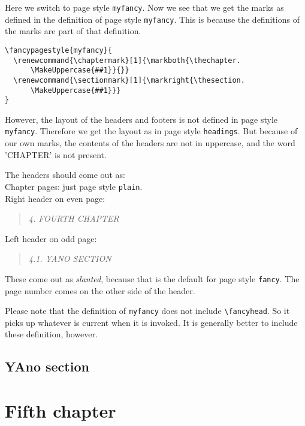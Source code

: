 \documentclass[openany]{book}
\renewcommand{\chaptermark}[1]{\markboth{\thechapter.\ #1}{}}
\renewcommand{\sectionmark}[1]{\markright{\thesection.\ #1}}
\renewcommand{\chaptermark}[1]{\markboth{\thechapter.
      \MakeUppercase{##1}}{}}
\renewcommand{\sectionmark}[1]{\markright{\thesection.
      \MakeUppercase{##1}}}
\renewcommand{\chaptermark}[1]{\markboth{\thechapter.\ ##1}{}}
\renewcommand{\sectionmark}[1]{\markright{\thesection.\ ##1}}
\begin{document}
\noindent
\begin{boxedminipage}{\textwidth}
Here we switch to page style \texttt{myfancy}.
Now we see that we get the marks as defined in the definition of page style \texttt{myfancy}.
This is because the definitions of the marks are  part of that definition.
\begin{verbatim}
\fancypagestyle{myfancy}{
  \renewcommand{\chaptermark}[1]{\markboth{\thechapter.
      \MakeUppercase{##1}}{}}
  \renewcommand{\sectionmark}[1]{\markright{\thesection.
      \MakeUppercase{##1}}}
}
\end{verbatim}

However, the layout of the headers and footers is not defined in page style \texttt{myfancy}. Therefore we get the layout as in page style \texttt{headings}. 
But because of our own marks, the contents of the headers are not in uppercase, and the word 'CHAPTER' is not present.

The headers should come out as:
\\
Chapter pages: just page style \texttt{plain}.
\\
Right header on even page:
\begin{quote}
  \textsl{4. FOURTH CHAPTER}
\end{quote}
Left header on odd page:
\begin{quote}
  \textsl{4.1. YANO SECTION}
\end{quote}
These come out as \textsl{slanted}, because that is the default for page style \texttt{fancy}.
The page number comes on the other side of the header.

Please note that the definition of \texttt{myfancy} does not include \verb|\fancyhead|. So it picks up whatever is current when it is invoked. It is generally better to include these definition, however.
\end{boxedminipage}
\bigskip

\lipsum[1]

\section{YAno section}

\lipsum

\newpage
\pagestyle{myotherfancy}
\chapter{Fifth chapter}
\end{document}
